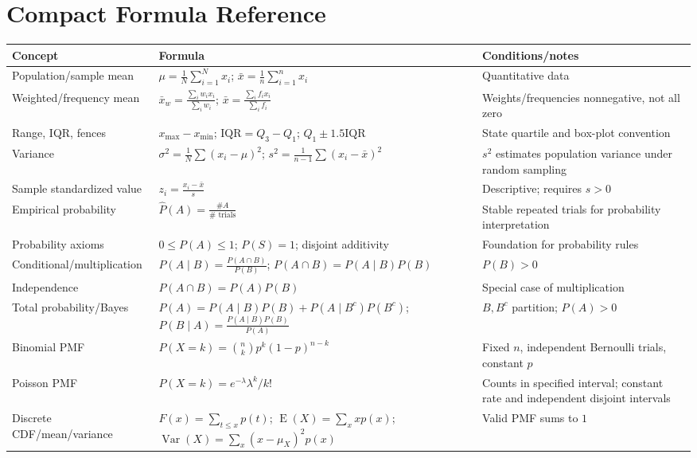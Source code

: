 \documentclass[11pt]{article}
\newcommand{\E}{\operatorname{E}}
\newcommand{\Var}{\operatorname{Var}}
\begin{document}
\section*{Compact Formula Reference}
\begin{center}
\small
\begin{tabularx}{\textwidth}{@{}lYY@{}}
\toprule
Concept & Formula & Conditions/notes \\
\midrule
Population/sample mean & $\displaystyle \mu=\frac1N\sum_{i=1}^{N}x_i$; $\displaystyle \bar{x}=\frac1n\sum_{i=1}^{n}x_i$ & Quantitative data \\
Weighted/frequency mean & $\displaystyle \bar{x}_w=\frac{\sum_iw_ix_i}{\sum_iw_i}$; $\displaystyle \bar{x}=\frac{\sum_if_ix_i}{\sum_if_i}$ & Weights/frequencies nonnegative, not all zero \\
Range, IQR, fences & $x_{\max}-x_{\min}$; $\mathrm{IQR}=Q_3-Q_1$; $Q_1\pm1.5\mathrm{IQR}$ & State quartile and box-plot convention \\
Variance & $\displaystyle \sigma^2=\frac1N\sum (x_i-\mu)^2$; $\displaystyle s^2=\frac1{n-1}\sum (x_i-\bar{x})^2$ & $s^2$ estimates population variance under random sampling \\
Sample standardized value & $\displaystyle z_i=\frac{x_i-\bar{x}}{s}$ & Descriptive; requires $s>0$ \\
Empirical probability & $\displaystyle \widehat P(A)=\frac{\#A}{\#\text{ trials}}$ & Stable repeated trials for probability interpretation \\
Probability axioms & $0\le P(A)\le1$; $P(S)=1$; disjoint additivity & Foundation for probability rules \\
Conditional/multiplication & $\displaystyle P(A\mid B)=\frac{P(A\cap B)}{P(B)}$; $P(A\cap B)=P(A\mid B)P(B)$ & $P(B)>0$ \\
Independence & $P(A\cap B)=P(A)P(B)$ & Special case of multiplication \\
Total probability/Bayes & $P(A)=P(A\mid B)P(B)+P(A\mid B^c)P(B^c)$; $\displaystyle P(B\mid A)=\frac{P(A\mid B)P(B)}{P(A)}$ & $B,B^c$ partition; $P(A)>0$ \\
Binomial PMF & $\displaystyle P(X=k)=\binom nkp^k(1-p)^{n-k}$ & Fixed $n$, independent Bernoulli trials, constant $p$ \\
Poisson PMF & $\displaystyle P(X=k)=e^{-\lambda}\lambda^k/k!$ & Counts in specified interval; constant rate and independent disjoint intervals \\
Discrete CDF/mean/variance & $F(x)=\sum_{t\le x}p(t)$; $\E(X)=\sum_xxp(x)$; $\Var(X)=\sum_x(x-\mu_X)^2p(x)$ & Valid PMF sums to $1$ \\

\end{tabularx}
\end{center}
\end{document}
